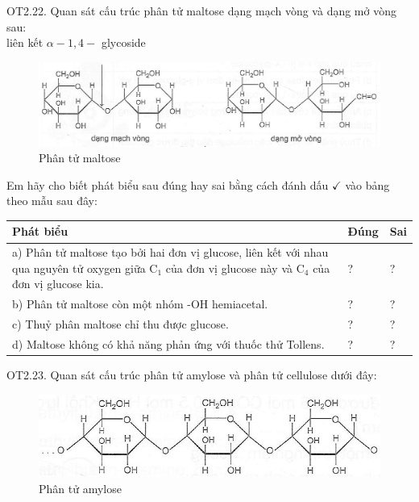 \documentclass[10pt]{article}
\begin{document}
OT2.22. Quan sát cấu trúc phân tử maltose dạng mạch vòng và dạng mở vòng sau:\\
liên kết $\alpha-1,4-$ glycoside

\begin{figure}[h]
\begin{center}
  \includegraphics[width=\textwidth]{2025_10_23_de6f5713836e4e91b3c8g-043(2)}
\captionsetup{labelformat=empty}
\caption{Phân tử maltose}
\end{center}
\end{figure}

Em hãy cho biết phát biểu sau đúng hay sai bằng cách đánh dấu $\checkmark$ vào bảng theo mẫu sau đây:

\begin{center}
\begin{tabular}{|l|l|l|}
\hline
Phát biểu & Đúng & Sai \\
\hline
a) Phân tử maltose tạo bởi hai đơn vị glucose, liên kết với nhau qua nguyên tử oxygen giữa $\mathrm{C}_{1}$ của đơn vị glucose này và $\mathrm{C}_{4}$ của đơn vị glucose kia. & ? & ? \\
\hline
b) Phân tử maltose còn một nhóm -OH hemiacetal. & ? & ? \\
\hline
c) Thuỷ phân maltose chỉ thu được glucose. & ? & ? \\
\hline
d) Maltose không có khả năng phản ứng với thuốc thử Tollens. & ? & ? \\
\hline
\end{tabular}
\end{center}

OT2.23. Quan sát cấu trúc phân tử amylose và phân tử cellulose dưới đây:

\begin{figure}[h]
\begin{center}
  \includegraphics[width=\textwidth]{2025_10_23_de6f5713836e4e91b3c8g-043}
\captionsetup{labelformat=empty}
\caption{Phân tử amylose}
\end{center}
\end{figure}
\end{document}
